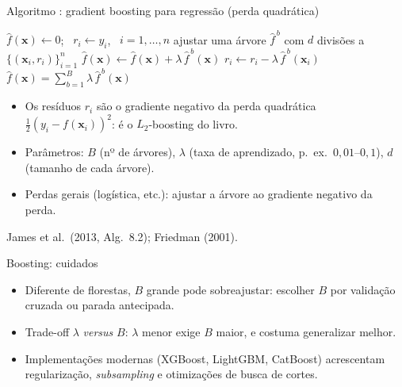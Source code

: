 \begin{frame}[t]{Algoritmo \aGB: gradient boosting para regressão (perda quadrática)}
\small
\begin{algorithmic}[1]
\State $\hat f(\mathbf x)\gets0$; \ $r_i\gets y_i$, \ $i=1,\dots,n$
  \State ajustar uma árvore $\hat f^{\,b}$ com $d$ divisões a $\{(\mathbf x_i,r_i)\}_{i=1}^n$ 
  \State $\hat f(\mathbf x)\gets\hat f(\mathbf x)+\lambda\,\hat f^{\,b}(\mathbf x)$
  \State $r_i\gets r_i-\lambda\,\hat f^{\,b}(\mathbf x_i)$
\EndFor
\State \Return $\hat f(\mathbf x)=\sum_{b=1}^B\lambda\,\hat f^{\,b}(\mathbf x)$
\end{algorithmic}
\vspace{6pt}
\begin{itemize}
  \item Os resíduos $r_i$ são o \alert{gradiente negativo} da perda quadrática $\tfrac12(y_i-f(\mathbf x_i))^2$: é o $L_2$-boosting do livro.
  \item Parâmetros: $B$ (nº de árvores), $\lambda$ (taxa de aprendizado, p.\ ex.\ $0{,}01$--$0{,}1$), $d$ (tamanho de cada árvore).
  \item Perdas gerais (logística, etc.): ajustar a árvore ao gradiente negativo da perda.
\end{itemize}
{\footnotesize James et al.\ (2013, Alg.~8.2); Friedman (2001).}
\end{frame}

\begin{frame}{Boosting: cuidados}
\begin{itemize}
  \item Diferente de florestas, $B$ grande \alert{pode} sobreajustar: escolher $B$ por validação cruzada ou parada antecipada.
  \item Trade-off $\lambda$ \emph{versus} $B$: $\lambda$ menor exige $B$ maior, e costuma generalizar melhor.
  \item Implementações modernas (XGBoost, LightGBM, CatBoost) acrescentam regularização, \emph{subsampling} e otimizações de busca de cortes.
\end{itemize}
\end{frame}

